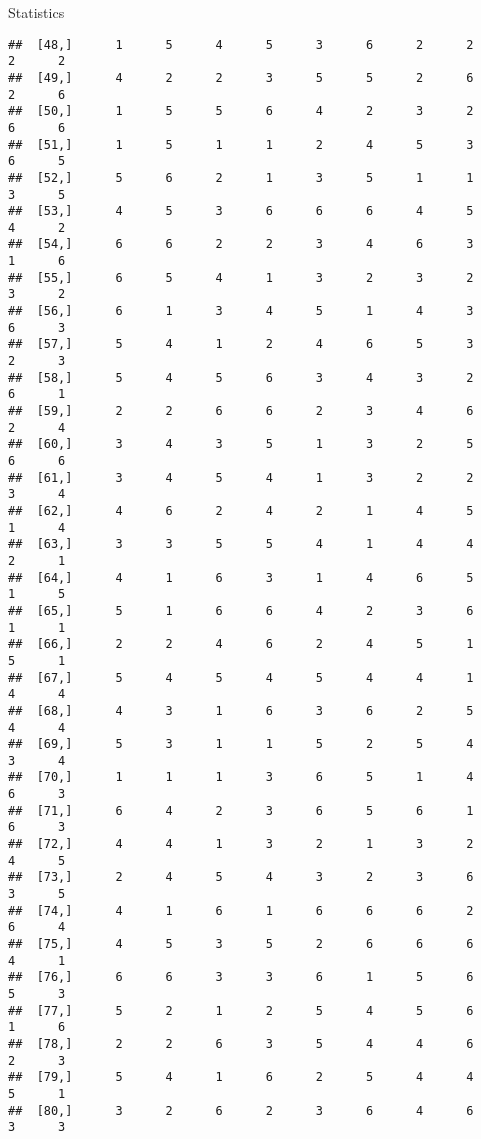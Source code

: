 \documentclass[
  ignorenonframetext,
]{beamer}
\begin{document}
\begin{frame}[fragile]{Statistics}
\begin{verbatim}
##  [48,]      1      5      4      5      3      6      2      2      2      2
##  [49,]      4      2      2      3      5      5      2      6      2      6
##  [50,]      1      5      5      6      4      2      3      2      6      6
##  [51,]      1      5      1      1      2      4      5      3      6      5
##  [52,]      5      6      2      1      3      5      1      1      3      5
##  [53,]      4      5      3      6      6      6      4      5      4      2
##  [54,]      6      6      2      2      3      4      6      3      1      6
##  [55,]      6      5      4      1      3      2      3      2      3      2
##  [56,]      6      1      3      4      5      1      4      3      6      3
##  [57,]      5      4      1      2      4      6      5      3      2      3
##  [58,]      5      4      5      6      3      4      3      2      6      1
##  [59,]      2      2      6      6      2      3      4      6      2      4
##  [60,]      3      4      3      5      1      3      2      5      6      6
##  [61,]      3      4      5      4      1      3      2      2      3      4
##  [62,]      4      6      2      4      2      1      4      5      1      4
##  [63,]      3      3      5      5      4      1      4      4      2      1
##  [64,]      4      1      6      3      1      4      6      5      1      5
##  [65,]      5      1      6      6      4      2      3      6      1      1
##  [66,]      2      2      4      6      2      4      5      1      5      1
##  [67,]      5      4      5      4      5      4      4      1      4      4
##  [68,]      4      3      1      6      3      6      2      5      4      4
##  [69,]      5      3      1      1      5      2      5      4      3      4
##  [70,]      1      1      1      3      6      5      1      4      6      3
##  [71,]      6      4      2      3      6      5      6      1      6      3
##  [72,]      4      4      1      3      2      1      3      2      4      5
##  [73,]      2      4      5      4      3      2      3      6      3      5
##  [74,]      4      1      6      1      6      6      6      2      6      4
##  [75,]      4      5      3      5      2      6      6      6      4      1
##  [76,]      6      6      3      3      6      1      5      6      5      3
##  [77,]      5      2      1      2      5      4      5      6      1      6
##  [78,]      2      2      6      3      5      4      4      6      2      3
##  [79,]      5      4      1      6      2      5      4      4      5      1
##  [80,]      3      2      6      2      3      6      4      6      3      3

\end{verbatim}
\end{frame}
\end{document}
